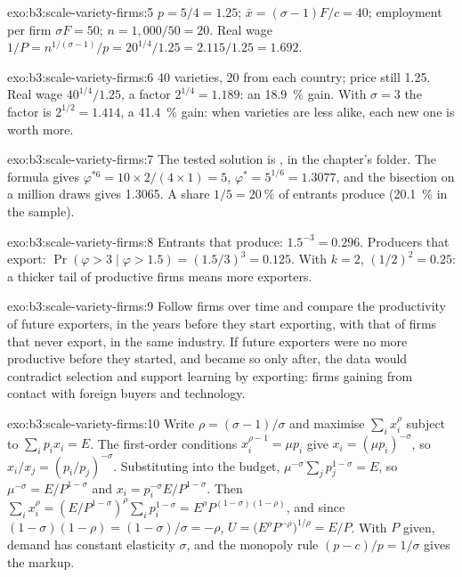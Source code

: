 \begin{solution}{exo:b3:scale-variety-firms:5}
$p = 5/4 = 1.25$; $\bar x = (\sigma - 1)F/c = 40$; employment per firm $\sigma F = 50$;
$n = 1{,}000/50 = 20$. Real wage $1/P = n^{1/(\sigma-1)}/p = 20^{1/4}/1.25 = 2.115/1.25 =
1.692$.
\end{solution}

\begin{solution}{exo:b3:scale-variety-firms:6}
40 varieties, 20 from each country; price still 1.25. Real wage $40^{1/4}/1.25$, a
factor $2^{1/4} = 1.189$: an 18.9~\% gain. With $\sigma = 3$ the factor is $2^{1/2} =
1.414$, a 41.4~\% gain: when varieties are less alike, each new one is worth more.
\end{solution}

\begin{solution}{exo:b3:scale-variety-firms:7}
The tested solution is , in the chapter's 
folder. The formula gives $\varphi^{*6} = 10 \times 2/(4 \times 1) = 5$, $\varphi^* = 5^{1/6} =
1.3077$, and the bisection on a million draws gives 1.3065. A share $1/5 = 20~\%$ of
entrants produce (20.1~\% in the sample). %
\end{solution}

\begin{solution}{exo:b3:scale-variety-firms:8}
Entrants that produce: $1.5^{-3} = 0.296$. Producers that export: $\Pr(\varphi > 3 \mid
\varphi > 1.5) = (1.5/3)^3 = 0.125$. With $k = 2$, $(1/2)^2 = 0.25$: a thicker tail of
productive firms means more exporters.
\end{solution}

\begin{solution}{exo:b3:scale-variety-firms:9}
Follow firms over time and compare the productivity of future exporters, in the
years before they start exporting, with that of firms that never export, in the
same industry. If future exporters were no more productive before they started,
and became so only after, the data would contradict selection and support
learning by exporting: firms gaining from contact with foreign buyers and
technology.
\end{solution}

\begin{solution}{exo:b3:scale-variety-firms:10}
Write $\rho = (\sigma - 1)/\sigma$ and maximise $\sum_i x_i^\rho$ subject to $\sum_i p_i x_i = E$.
The first-order conditions $x_i^{\rho - 1} = \mu p_i$ give $x_i = (\mu p_i)^{-\sigma}$, so
$x_i/x_j = (p_i/p_j)^{-\sigma}$. Substituting into the budget, $\mu^{-\sigma}\sum_j p_j^{1-\sigma} = E$,
so $\mu^{-\sigma} = E/P^{1-\sigma}$ and $x_i = p_i^{-\sigma}E/P^{1-\sigma}$. Then $\sum_i x_i^\rho =
(E/P^{1-\sigma})^\rho \sum_i p_i^{1-\sigma} = E^\rho P^{(1-\sigma)(1-\rho)}$, and since $(1-\sigma)(1-\rho) =
(1-\sigma)/\sigma = -\rho$, $U = \bigl(E^\rho P^{-\rho}\bigr)^{1/\rho} = E/P$. With $P$ given, demand has
constant elasticity $\sigma$, and the monopoly rule $(p - c)/p = 1/\sigma$ gives the
markup.
\end{solution}


